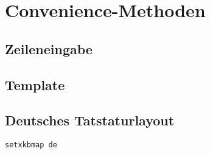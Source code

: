 \section{Convenience-Methoden}

\subsection{Zeileneingabe}


\subsection{Template}


\subsection{Deutsches Tatstaturlayout}
\begin{lstlisting}
setxkbmap de
\end{lstlisting}
